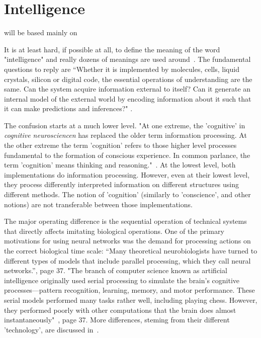
\iflatexml
\else
\minitoc
\fi
\chapter[Intelligence]{Intelligence\label{ch:Intelligence}}
will be based mainly on \cite{WhyMachineLearningDifferent:2021}


It is at least hard, if possible at all, to define the meaning of the word "intelligence"
and really dozens of meanings are used around~\cite{MachineVersusLivingIntelligence:2024}. 
The fundamental questions to reply are 
“Whether it is implemented by molecules, cells, liquid crystals, silicon or digital code, the essential operations of understanding are the same. Can the system acquire information external to itself? Can it generate an internal model of the external world by encoding information about it such that it can make predictions and inferences?" 
\cite{SeekingClarityAI:2024}.	


The confusion starts at a much lower level. "At one extreme, the 'cognitive' in \hypertarget{CognitiveMatter}{\textit{cognitive neurosciencen}} has replaced the older term information processing. At the other extreme the term 'cognition' refers to those higher level processes fundamental to the formation of conscious experience. In common parlance, the term 'cognition' means thinking and reasoning."~\cite{PrinciplesNeuralScience:2013}. At the lowest level, both implementations do information processing. However, even at their lowest level, they process differently interpreted information on different structures using different methods. The notion of 'cognition' (similarly to 'conscience', and other notions) are not transferable between those implementations.

The major operating difference is the sequential operation of technical systems that directly affects imitating biological operations.
One of the primary motivations for using neural networks was the demand for processing actions on the correct biological time scale:
“Many theoretical neurobiologists have turned to different types of models that include parallel processing, which they call neural networks.”\cite{PrinciplesNeuralScience:2013}, page 37.
"The branch of computer science known as artificial intelligence originally used serial processing to simulate the brain’s cognitive processes—pattern recognition, learning, memory, and motor performance.
These serial models performed many tasks rather well, including playing chess. However, they performed poorly with other computations that the brain does almost instantaneously"~\cite{PrinciplesNeuralScience:2013}, page 37. 
More differences, steming from their different 'technology', are discussed in~\cite{WhyMachineLearningDifferent:2021}.


